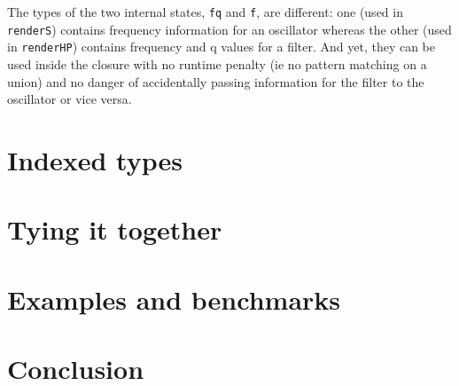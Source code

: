 \documentclass{article}
\begin{document}
The types of the two internal states, \texttt{fq} and \texttt{f}, are different: one (used in \texttt{renderS}) contains frequency information for an oscillator whereas the other (used in \texttt{renderHP}) contains frequency and q values for a filter. And yet, they can be used inside the closure with no runtime penalty (ie no pattern matching on a union) and no danger of accidentally passing information for the filter to the oscillator or vice versa.

\section{Indexed types}
\label{sec:indexed_types}

\section{Tying it together}
\label{sec:tying_it_together}

\section{Examples and benchmarks}
\label{sec:examples_and_benchmarks}

\section{Conclusion}
\label{sec:conclusion}



\end{document}
